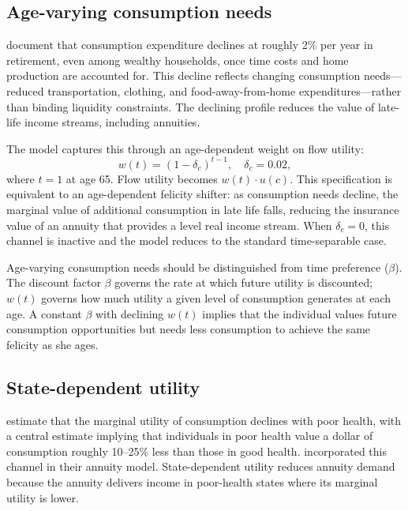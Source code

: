 \documentclass[12pt]{article}
\begin{document}
\subsection{Age-varying consumption needs}
\label{sec:age_needs}

\citet{aguiarhurst2013} document that consumption expenditure declines at roughly 2\% per year in retirement, even among wealthy households, once time costs and home production are accounted for. This decline reflects changing consumption needs---reduced transportation, clothing, and food-away-from-home expenditures---rather than binding liquidity constraints. The declining profile reduces the value of late-life income streams, including annuities.

The model captures this through an age-dependent weight on flow utility:
\begin{equation}
\label{eq:age_needs}
w(t) = (1 - \delta_c)^{t-1}, \quad \delta_c = 0.02,
\end{equation}
where $t = 1$ at age 65. Flow utility becomes $w(t) \cdot u(c)$. This specification is equivalent to an age-dependent felicity shifter: as consumption needs decline, the marginal value of additional consumption in late life falls, reducing the insurance value of an annuity that provides a level real income stream. When $\delta_c = 0$, this channel is inactive and the model reduces to the standard time-separable case.

Age-varying consumption needs should be distinguished from time preference ($\beta$). The discount factor $\beta$ governs the rate at which future utility is discounted; $w(t)$ governs how much utility a given level of consumption generates at each age. A constant $\beta$ with declining $w(t)$ implies that the individual values future consumption opportunities but needs less consumption to achieve the same felicity as she ages.

\subsection{State-dependent utility}
\label{sec:state_dependent}

\citet{finkelsteinluttmer2013} estimate that the marginal utility of consumption declines with poor health, with a central estimate implying that individuals in poor health value a dollar of consumption roughly 10--25\% less than those in good health. \citet{reichlingsmetters2015} incorporated this channel in their annuity model. State-dependent utility reduces annuity demand because the annuity delivers income in poor-health states where its marginal utility is lower.
\end{document}
